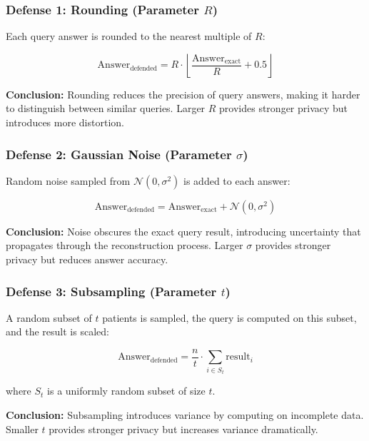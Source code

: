 \documentclass[11pt,letterpaper]{article}
\begin{document}
\subsubsection{Defense 1: Rounding (Parameter $R$)}

Each query answer is rounded to the nearest multiple of $R$:

\begin{equation}
    \text{Answer}_{\text{defended}} = R \cdot \left\lfloor \frac{\text{Answer}_{\text{exact}}}{R} + 0.5 \right\rfloor
\end{equation}

\textbf{Conclusion:} Rounding reduces the precision of query answers, making it harder to distinguish between similar queries. Larger $R$ provides stronger privacy but introduces more distortion.

\subsubsection{Defense 2: Gaussian Noise (Parameter $\sigma$)}

Random noise sampled from $\mathcal{N}(0, \sigma^2)$ is added to each answer:

\begin{equation}
    \text{Answer}_{\text{defended}} = \text{Answer}_{\text{exact}} + \mathcal{N}(0, \sigma^2)
\end{equation}

\textbf{Conclusion:} Noise obscures the exact query result, introducing uncertainty that propagates through the reconstruction process. Larger $\sigma$ provides stronger privacy but reduces answer accuracy.

\subsubsection{Defense 3: Subsampling (Parameter $t$)}

A random subset of $t$ patients is sampled, the query is computed on this subset, and the result is scaled:

\begin{equation}
    \text{Answer}_{\text{defended}} = \frac{n}{t} \cdot \sum_{i \in S_t} \text{result}_i
\end{equation}

where $S_t$ is a uniformly random subset of size $t$.

\textbf{Conclusion:} Subsampling introduces variance by computing on incomplete data. Smaller $t$ provides stronger privacy but increases variance dramatically.
\end{document}
